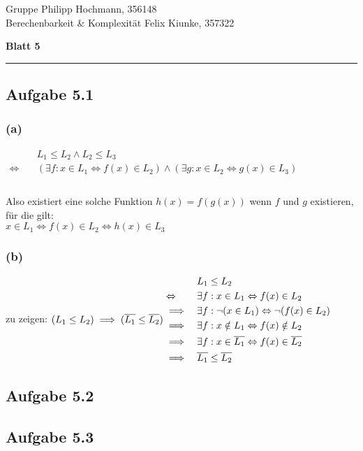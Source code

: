 \documentclass[a4paper,graphics,11pt]{article}
\newcommand\aufgabe[1]{\subsection*{Aufgabe #1}}
\newcommand\aufgabenteil[1]{\subsubsection*{#1}}
\begin{document}
\noindent Gruppe              \hfill Philipp Hochmann, 356148 \\
\noindent Berechenbarkeit \& Komplexität \hfill Felix Kiunke, 357322 \\

\begin{center}
	\LARGE{\textbf{Blatt 5}}
\end{center}
\begin{center}
\rule[0.1ex]{\textwidth}{1pt}
\end{center}

\aufgabe{5.1}
\aufgabenteil{(a)}
$
\begin{aligned}
&L_1 \leq L_2 \wedge L_2 \leq L_3\\
\Leftrightarrow \quad &(\exists f: x \in L_1 \Leftrightarrow f(x) \in L_2) \wedge (\exists g: x \in L_2 \Leftrightarrow g(x) \in L_3)\\
\end{aligned}
$
\\ \ \\
Also existiert eine solche Funktion $h(x)=f(g(x))$ wenn $f$ und $g$ existieren, für die gilt:\\
$ x \in L_1 \Leftrightarrow f(x) \in L_2 \Leftrightarrow h(x) \in L_3$

\aufgabenteil{(b)}
zu zeigen: \quad$(L_1 \leq L_2) \implies (\overline{L_1} \leq \overline{L_2})\\ \ \\
\begin{aligned}
& &&L_1 \leq L_2\\
&\Leftrightarrow &&\exists f: x \in L_1 \Leftrightarrow f(x) \in L_2\\
&\implies &&\exists f: \neg (x \in L_1) \Leftrightarrow \neg (f(x) \in L_2)\\
&\implies && \exists f: x \notin L_1 \Leftrightarrow f(x) \notin L_2\\
&\implies && \exists f: x \in \overline{L_1} \Leftrightarrow f(x) \in \overline{L_2}\\
&\implies && \overline{L_1} \leq \overline{L_2}
\end{aligned}$

\aufgabe{5.2}

\aufgabe{5.3}

\end{document}
